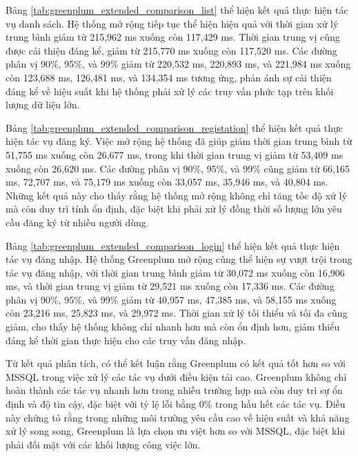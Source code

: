 \documentclass{article}[14pt]
\begin{document}
Bảng \ref{tab:greenplum_extended_comparison_list} thể hiện kết quả thực hiện tác vụ danh sách. Hệ thống mở rộng tiếp tục thể hiện hiệu quả với thời gian xử lý trung bình giảm từ 215,962 ms xuống còn 117,429 ms. Thời gian trung vị cũng được cải thiện đáng kể, giảm từ 215,770 ms xuống còn 117,520 ms. Các đường phân vị 90\%, 95\%, và 99\% giảm từ 220,532 ms, 220,893 ms, và 221,984 ms xuống còn 123,688 ms, 126,481 ms, và 134,354 ms tương ứng, phản ánh sự cải thiện đáng kể về hiệu suất khi hệ thống phải xử lý các truy vấn phức tạp trên khối lượng dữ liệu lớn.

Bảng \ref{tab:greenplum_extended_comparison_registation} thể hiện kết quả thực hiện tác vụ đăng ký. Việc mở rộng hệ thống đã giúp giảm thời gian trung bình từ 51,755 ms xuống còn 26,677 ms, trong khi thời gian trung vị giảm từ 53,409 ms xuống còn 26,620 ms. Các đường phân vị 90\%, 95\%, và 99\% cũng giảm từ 66,165 ms, 72,707 ms, và 75,179 ms xuống còn 33,057 ms, 35,946 ms, và 40,804 ms. Những kết quả này cho thấy rằng hệ thống mở rộng không chỉ tăng tốc độ xử lý mà còn duy trì tính ổn định, đặc biệt khi phải xử lý đồng thời số lượng lớn yêu cầu đăng ký từ nhiều người dùng.

Bảng \ref{tab:greenplum_extended_comparison_login} thể hiện kết quả thực hiện tác vụ đăng nhập. Hệ thống Greenplum mở rộng cũng thể hiện sự vượt trội trong tác vụ đăng nhập, với thời gian trung bình giảm từ 30,072 ms xuống còn 16,906 ms, và thời gian trung vị giảm từ 29,521 ms xuống còn 17,336 ms. Các đường phân vị 90\%, 95\%, và 99\% giảm từ 40,957 ms, 47,385 ms, và 58,155 ms xuống còn 23,216 ms, 25,823 ms, và 29,972 ms. Thời gian xử lý tối thiểu và tối đa cũng giảm, cho thấy hệ thống không chỉ nhanh hơn mà còn ổn định hơn, giảm thiểu đáng kể thời gian thực hiện cho các truy vấn đăng nhập.



Từ kết quả phân tích, có thể kết luận rằng Greenplum có kết quả tốt hơn so với MSSQL trong việc xử lý các tác vụ dưới điều kiện tải cao. Greenplum không chỉ hoàn thành các tác vụ nhanh hơn trong nhiều trường hợp mà còn duy trì sự ổn định và độ tin cậy, đặc biệt với tỷ lệ lỗi bằng 0\% trong hầu hết các tác vụ. Điều này chứng tỏ rằng trong những môi trường yêu cầu cao về hiệu suất và khả năng xử lý song song, Greenplum là lựa chọn ưu việt hơn so với MSSQL, đặc biệt khi phải đối mặt với các khối lượng công việc lớn.
\end{document}
